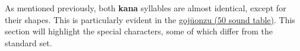 As mentioned previously, both \textbf{kana} syllables are almost identical,
except for their shapes. This is particularly evident in the
\hyperref[sec:Gojuonzu]{gojūonzu (50 sound table)}. This section will highlight
the special characters, some of which differ from the standard \jtopic{} set.


\label{subsec:DoublingVowelsIn\jscript}
\label{subsec:DoublingVowels}
\label{sec:DoublingVowelsIn\jscript}
\label{sec:DoublingVowels}


